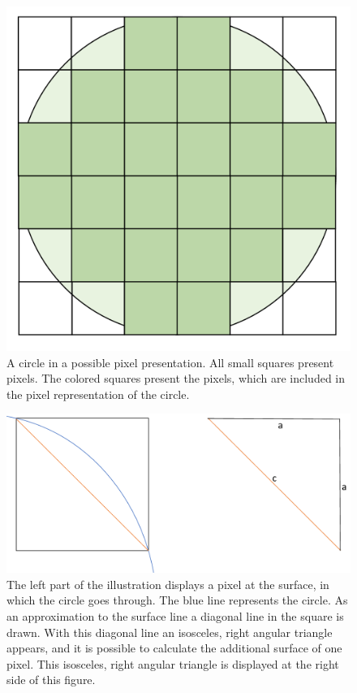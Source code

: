 \begin{figure}[H]
	\center
	\includegraphics[scale=0.15]{figures/PixelCircleSquare.png}
	\caption[A circle in a possible pixel presentation]{A circle in a possible pixel presentation. All small squares present pixels. The colored squares present the pixels, which are included in the pixel representation of the circle.}
	\label{img:CircleSquarePixels}
\end{figure}

\begin{figure}[!]
\center
	\includegraphics[scale=0.3]{figures/SurfaceApproximationSQRT2.png}
	\caption[An approximation to the surface of a sphere with a pixel and a diagonal]{The left part of the illustration displays a pixel at the surface, in which the circle goes through. The blue line represents the circle. As an approximation to the surface line a diagonal line in the square is drawn. With this diagonal line an isosceles, right angular triangle appears, and it is possible to calculate the additional surface of one pixel. This isosceles, right angular triangle is displayed at the right side of this figure.}
	\label{img:ApproximationSQRT2}
\end{figure}


